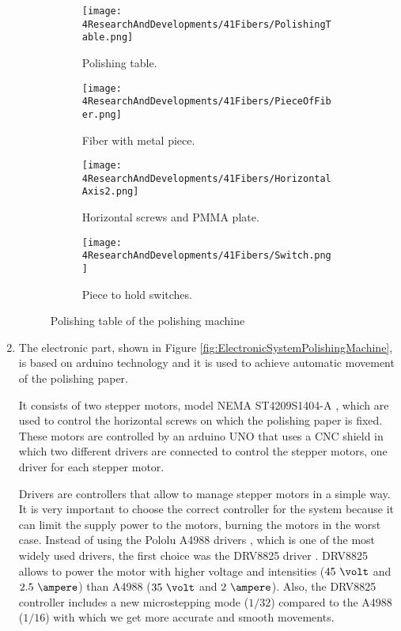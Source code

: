 \begin{enumerate}
\begin{figure}
\centering
    \begin{subfigure}[b]{0.55\textwidth}
    \centering
    \texttt{[image: 4ResearchAndDevelopments/41Fibers/PolishingTable.png]}  
    \caption{Polishing table.\label{subfig:PolishingTable}}
    \end{subfigure}
    \hfill
    \begin{subfigure}[b]{0.3\textwidth}
    \centering
    \texttt{[image: 4ResearchAndDevelopments/41Fibers/PieceOfFiber.png]}  
    \caption{Fiber with metal piece.\label{subfig:FiberMetailcPiece}}
    \end{subfigure}
    \hfill
    \begin{subfigure}[b]{0.55\textwidth}
    \centering
    \texttt{[image: 4ResearchAndDevelopments/41Fibers/HorizontalAxis2.png]}  
    \caption{Horizontal screws and PMMA plate.\label{subfig:HorizontalAxis}}
    \end{subfigure}
    \hfill
    \begin{subfigure}[b]{0.4\textwidth}
    \centering
    \texttt{[image: 4ResearchAndDevelopments/41Fibers/Switch.png]}  
    \caption{Piece to hold switches.\label{subfig:3DSwitchPiece}}
    \end{subfigure}
 \caption{Polishing table of the polishing machine}
 \label{fig:PolishingTable}
\end{figure}

\item{} The electronic part, shown in Figure \ref{fig:ElectronicSystemPolishingMachine}, is based on arduino technology and it is used to achieve automatic movement of the polishing paper.

It consists of two stepper motors, model NEMA ST4209S1404-A \cite{StepperMotors}, which are used to control the horizontal screws on which the polishing paper is fixed. These motors are controlled by an arduino UNO \cite{ArduinoUNO} that uses a CNC shield \cite{CNCShield} in which two different drivers are connected to control the stepper motors, one driver for each stepper motor.

Drivers are controllers that allow to manage stepper motors in a simple way. It is very important to choose the correct controller for the system because it can limit the supply power to the motors, burning the motors in the worst case. Instead of using the Pololu A4988 drivers \cite{A4988Driver}, which is one of the most widely used drivers, the first choice was the DRV8825 driver \cite{DRV8825Driver}. DRV8825 allows to power the motor with higher voltage and intensities ($45~\volt$ and $2.5~\ampere$) than A4988 ($35~\volt$ and $2~\ampere$). Also, the DRV8825 controller includes a new microstepping mode ($1/32$) compared to the A4988 ($1/16$) with which we get more accurate and smooth movements.


\end{enumerate}
